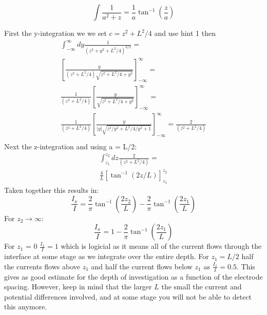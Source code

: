 $$\int \frac{1}{a^2+z} = \frac{1}{a}\tan^{-1}(\frac{z}{a})$$
\ifanswers
    \begin{tcolorbox}[enhanced jigsaw,breakable,pad at break*=1mm,
    colback=blue!5!white,colframe=babyblueeyes,title=Solutions,
    watermark color=white]
    First the y-integration we we set $c = z^2 + L^2/4$ and use hint 1 then 
    \begin{eqnarray*}
    \int_{-\infty}^{\infty}dy\frac{1}{(z^2+y^2+L^2/4)^{3/2}} = \\
    \left[  \frac{y}{(z^2 + L^2/4)\sqrt{z^2 + L^2/4 + y^2}}  \right]_{-\infty}^{\infty}  = \\
    \frac{1}{(z^2 + L^2/4)}\left[  \frac{y}{\sqrt{z^2 + L^2/4 + y^2}}  \right]_{-\infty}^{\infty}=\\
    \frac{1}{(z^2 + L^2/4)}\left[  \frac{y}{|y|\sqrt{z^2/y^2 + L^2/4/y^2 + 1}}  \right]_{-\infty}^{\infty}=\frac{2}{(z^2 + L^2/4)}\\
    \end{eqnarray*}
    Next the z-integration and using a = L/2:
    \begin{eqnarray*}
        \int_{z_1}^{z_2}dz \frac{2}{(z^2 + L^2/4)} = \\
        \frac{4}{L}\left[\tan^{-1}(2z/L) \right]_{z_1}^{z_2}
    \end{eqnarray*}
    Taken together this results in:
    $$
    \frac{I_x}{I} = \frac{2}{\pi}\tan^{-1}(\frac{2z_2}{L}) - \frac{2}{\pi}\tan^{-1}(\frac{2z_1}{L})
    $$
    For $z_2\rightarrow \infty$:
    $$
    \frac{I_x}{I} = 1 - \frac{2}{\pi}\tan^{-1}(\frac{2z_1}{L})
    $$
    For $z_1$ = 0 $\frac{I_x}{I} = 1$ which is logicial as it means all of the current flows through the interface at some stage as we integrate over the entire depth. For $z_1 = L/2 $ half the currents flows above $z_1$ and half the current flows below $z_1$ as $\frac{I_x}{I} = 0.5$. This gives as good estimate for the depth of investigation as a function of the electrode spacing. However, keep in mind that the larger $L$ the small the current and potential differences involved, and at some stage you will not be able to detect this anymore. 
    \end{tcolorbox}
\fi

